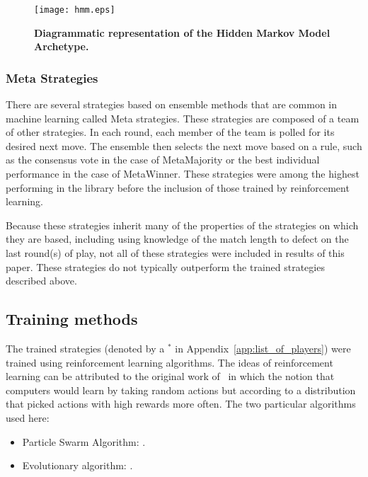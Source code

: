 \documentclass[10pt,letterpaper]{article}
\begin{document}
\begin{figure}[!hbtp]
    \centering
    \texttt{[image: hmm.eps]}
    \caption{\bf Diagrammatic representation of the Hidden Markov Model Archetype.}
    \label{fig:hmm}
\end{figure}


\subsubsection*{Meta Strategies}

There are several strategies based on ensemble methods that
are common in machine learning called Meta strategies. These strategies are
composed of a team of other strategies. In each round, each member of the team
is polled for its desired next
move. The ensemble then selects the next move based on a rule, such as the
consensus vote in the case of MetaMajority or the best individual performance
in the case of MetaWinner. These strategies were among the highest performing in 
the library before the inclusion of those trained by reinforcement learning. 

Because these strategies inherit many of the properties of the strategies
on which they are based, including using knowledge of the match length to defect
on the last round(s) of play, not all of these
strategies were included in results of this
paper. These strategies do not typically outperform the trained strategies
described above.

\subsection*{Training methods}\label{sec:methods}

The trained strategies (denoted by a \(^{*}\) in
Appendix~\ref{app:list_of_players}) were trained using reinforcement
learning algorithms. The ideas of reinforcement learning can be attributed to
the original work of~\cite{turing1950computing} in which the notion that
computers would learn by taking random actions but according to a distribution
that picked actions with high rewards more often. The two particular algorithms
used here:

\begin{itemize}
    \item Particle Swarm Algorithm: \cite{imran2013overview}.
    \item Evolutionary algorithm: \cite{moriarty1999evolutionary}.
\end{itemize}
\end{document}
